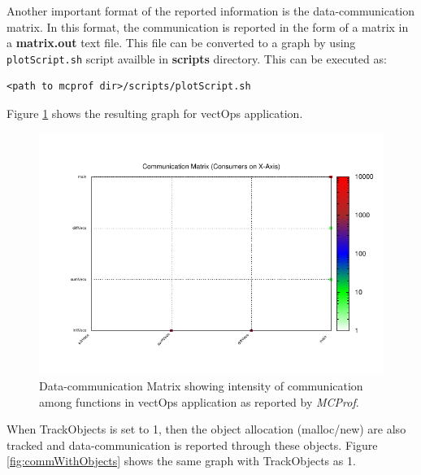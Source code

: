 \documentclass[10pt]{article}
\newcommand{\MCPROF}{\emph{MCProf}}
\begin{document}
Another important format of the reported information is the data-communication 
matrix. In this format, the communication is reported in the form of a matrix in 
a \textbf{matrix.out} text file. This file can be converted to a graph by using 
\verb|plotScript.sh| script availble in \textbf{scripts} directory. This can be 
executed as:

{
\small
\begin{Verbatim}[frame=single]
<path to mcprof dir>/scripts/plotScript.sh
\end{Verbatim}
}

Figure \ref{fig:matrix} shows the resulting graph for vectOps application.

\begin{figure}[!h]
\centering
\includegraphics[width=0.95\linewidth]{figures/matrix.pdf}
\caption{Data-communication Matrix showing intensity of communication
    among functions in vectOps application as reported by \MCPROF{}.}
\label{fig:matrix}
\end{figure}


When TrackObjects is set to 1, then the object allocation (malloc/new) are
also tracked and data-communication is reported through these objects. 
Figure \ref{fig:commWithObjects} shows the same graph with TrackObjects as 1.
\end{document}
